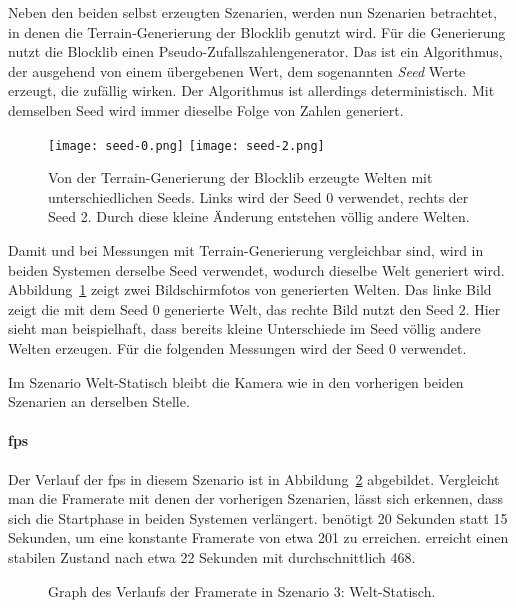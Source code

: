Neben den beiden selbst erzeugten Szenarien, werden nun Szenarien betrachtet, in denen die Terrain-Generierung der Blocklib genutzt wird. Für die Generierung nutzt die Blocklib einen Pseudo-Zufallszahlengenerator. Das ist ein Algorithmus, der ausgehend von einem übergebenen Wert, dem sogenannten \emph{Seed} Werte erzeugt, die zufällig wirken. Der Algorithmus ist allerdings deterministisch. Mit demselben Seed wird immer dieselbe Folge von Zahlen generiert.

\begin{figure}
	\centering
	\texttt{[image: seed-0.png]}
	\hfill
	\texttt{[image: seed-2.png]}
	\caption[Von der Terrain-Generierung der Blocklib erzeugte Welten mit unterschiedlichen Seeds.]{Von der Terrain-Generierung der Blocklib erzeugte Welten mit unterschiedlichen Seeds. Links wird der Seed 0 verwendet, rechts der Seed 2. Durch diese kleine Änderung entstehen völlig andere Welten.}\label{fig:static}
\end{figure}
Damit \sysA{} und \sysB{} bei Messungen mit Terrain-Generierung vergleichbar sind, wird in beiden Systemen derselbe Seed verwendet, wodurch dieselbe Welt generiert wird. Abbildung~\ref{fig:static} zeigt zwei Bildschirmfotos von generierten Welten. Das linke Bild zeigt die mit dem Seed $0$ generierte Welt, das rechte Bild nutzt den Seed $2$. Hier sieht man beispielhaft, dass bereits kleine Unterschiede im Seed völlig andere Welten erzeugen. Für die folgenden Messungen wird der Seed $0$ verwendet. 

Im Szenario Welt-Statisch bleibt die Kamera wie in den vorherigen beiden Szenarien an derselben Stelle.



\paragraph{\ac{fps}}

Der Verlauf der \ac{fps} in diesem Szenario ist in Abbildung~\ref{fig:seed-0-static-fps} abgebildet. Vergleicht man die Framerate mit denen der vorherigen Szenarien, lässt sich erkennen, dass sich die Startphase in beiden Systemen verlängert. \sysA{} benötigt 20 Sekunden statt 15 Sekunden, um eine konstante Framerate von etwa \SI{201}{\fps} zu erreichen. \sysB{} erreicht einen stabilen Zustand nach etwa 22 Sekunden mit durchschnittlich \SI{468}{\fps}.

\begin{figure}[!htbp]
	\caption{Graph des Verlaufs der Framerate in Szenario 3: Welt-Statisch.}\label{fig:seed-0-static-fps}
\end{figure}

